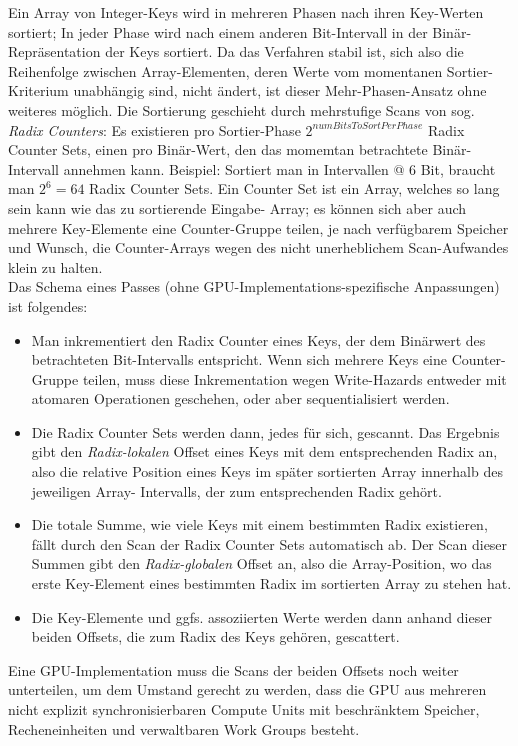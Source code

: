 		Ein Array von Integer-Keys wird in mehreren Phasen nach ihren Key-Werten sortiert;
		In jeder Phase wird nach einem anderen Bit-Intervall in der Binär-Repräsentation der Keys
		sortiert. Da das Verfahren stabil ist, sich also die Reihenfolge zwischen Array-Elementen,
		deren Werte vom momentanen Sortier-Kriterium unabhängig sind, nicht ändert, ist dieser
		Mehr-Phasen-Ansatz ohne	weiteres möglich.
		Die Sortierung geschieht durch mehrstufige Scans von sog. \emph{Radix Counters}:
		Es existieren pro Sortier-Phase $2^{numBitsToSortPerPhase}$ Radix Counter Sets, einen pro
		Binär-Wert, den das momemtan betrachtete Binär-Intervall annehmen kann.
		Beispiel: Sortiert man in Intervallen @ 6 Bit, braucht man $2^6=64$ Radix Counter Sets.
		Ein Counter Set ist ein Array, welches so lang sein kann wie das zu sortierende Eingabe-
		Array; es können sich aber auch mehrere Key-Elemente eine Counter-Gruppe teilen,
		je nach verfügbarem Speicher und Wunsch, die Counter-Arrays wegen des nicht unerheblichem Scan-Aufwandes
		klein zu halten.\\
		Das Schema eines Passes (ohne GPU-Implementations-spezifische Anpassungen) ist folgendes:
		\begin{itemize}
			\item Man inkrementiert den Radix Counter eines Keys, der dem Binärwert des betrachteten
			Bit-Intervalls entspricht. Wenn sich mehrere Keys eine Counter-Gruppe teilen, muss diese
			Inkrementation wegen Write-Hazards entweder mit atomaren Operationen geschehen, oder 
			aber sequentialisiert werden.
			\item Die Radix Counter Sets werden dann, jedes für sich, gescannt. Das Ergebnis gibt den
			\emph{Radix-lokalen} Offset eines Keys mit dem entsprechenden Radix an, also die relative
			Position eines Keys im später sortierten Array innerhalb des jeweiligen Array- Intervalls, 
			der zum entsprechenden Radix gehört.
			\item Die totale Summe, wie viele Keys mit einem bestimmten Radix existieren, fällt
			durch den Scan der Radix Counter Sets automatisch ab. Der Scan dieser Summen
			gibt den \emph{Radix-globalen} Offset an, also die Array-Position, wo das erste
			Key-Element eines bestimmten Radix im sortierten Array zu stehen hat.
			\item Die Key-Elemente und ggfs. assoziierten Werte werden dann anhand dieser beiden Offsets, die
			zum Radix des Keys gehören, gescattert.
		\end{itemize}
		Eine GPU-Implementation muss die Scans der beiden Offsets noch weiter unterteilen, um
		dem Umstand gerecht zu werden, dass die GPU aus mehreren nicht explizit synchronisierbaren
		Compute Units mit beschränktem Speicher, Recheneinheiten und verwaltbaren Work Groups besteht.
		
